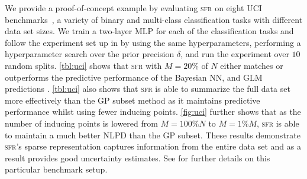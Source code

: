 \documentclass{article}
\newcommand{\our}{\textsc{sfr}\xspace}
\begin{document}
%
We provide a proof-of-concept example by evaluating \our on eight UCI benchmarks~\citep{UCI}, a variety of binary and multi-class classification tasks with different data set sizes.
We train a two-layer MLP for each of the classification tasks and follow the experiment set up in \citet{immer2021improving} by using the same hyperparameters, performing a hyperparameter search over the prior precision $\delta$, and run the experiment over $10$ random splits.
%
%
\cref{tbl:uci} shows that \our with $M=20\%$ of $N$ either matches or outperforms the predictive performance of the Bayesian NN, and GLM
predictions %
\citep[baselines from][]{immer2021improving}.
\cref{tbl:uci} also shows that \our is able to summarize the full data set more effectively than the GP subset method as it maintains predictive performance
whilst using fewer inducing points.
\cref{fig:uci} further shows that as the number of inducing points is lowered from $M=100\%N$ to $M=1\%M$, \our is able to maintain a much better NLPD than the GP subset.
These results demonstrate \our's sparse representation captures information from the entire data set and as a result provides good uncertainty estimates. See \citet{immer2021improving} for further details on this particular benchmark setup.
\end{document}
